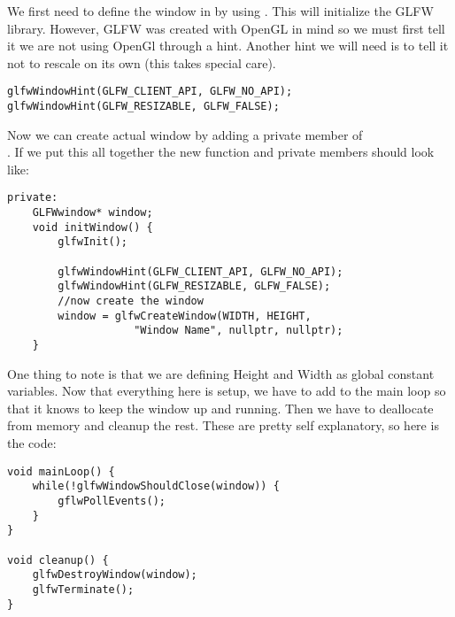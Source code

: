 \par We first need to define the window in  by using . This will initialize the GLFW library. However, GLFW was created with OpenGL in mind so we must first tell it we are not using OpenGl through a hint. Another hint we will need is to tell it not to rescale on its own (this takes special care).

\begin{center}
\begin{minipage}{0.95\linewidth}
\begin{lstlisting}
glfwWindowHint(GLFW_CLIENT_API, GLFW_NO_API);
glfwWindowHint(GLFW_RESIZABLE, GLFW_FALSE);
\end{lstlisting}
\end{minipage}
\end{center}

\par Now we can create actual window by adding a private member of \\
. If we put this all together the new  function and private members should look like:

\begin{center}
\begin{minipage}{0.95\linewidth}
\begin{lstlisting}
private:
    GLFWwindow* window;
    void initWindow() {
        glfwInit();
    
        glfwWindowHint(GLFW_CLIENT_API, GLFW_NO_API);
        glfwWindowHint(GLFW_RESIZABLE, GLFW_FALSE);
        //now create the window
        window = glfwCreateWindow(WIDTH, HEIGHT, 
                    "Window Name", nullptr, nullptr); 
    }
\end{lstlisting}
\end{minipage}
\end{center}

\par One thing to note is that we are defining Height and Width as global constant variables. Now that everything here is setup, we have to add to the main loop so that it knows to keep the window up and running. Then we have to deallocate from memory and cleanup the rest. These are pretty self explanatory, so here is the code:

\begin{center}
\begin{minipage}{0.95\linewidth}
\begin{lstlisting}
void mainLoop() {
    while(!glfwWindowShouldClose(window)) {
        gflwPollEvents();
    }
}

void cleanup() {
    glfwDestroyWindow(window);
    glfwTerminate();
}
\end{lstlisting}
\end{minipage}
\end{center}

